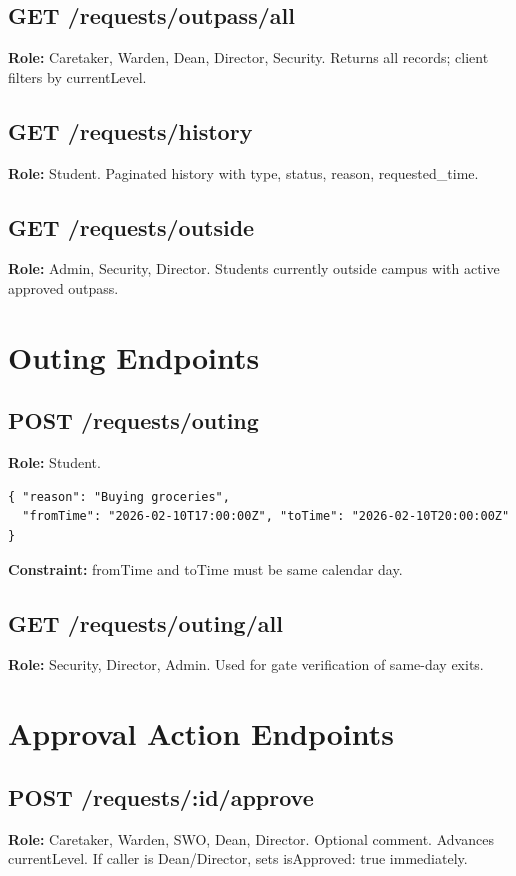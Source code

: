 \documentclass[12pt,a4paper]{report}
\begin{document}
\subsection{GET /requests/outpass/all}
\textbf{Role:} Caretaker, Warden, Dean, Director, Security. Returns all records; client filters by currentLevel.

\subsection{GET /requests/history} \textbf{Role:} Student. Paginated history with type, status, reason, requested\_time.

\subsection{GET /requests/outside} \textbf{Role:} Admin, Security, Director. Students currently outside campus with active approved outpass.

\section{Outing Endpoints}

\subsection{POST /requests/outing}
\textbf{Role:} Student.
\begin{lstlisting}[caption={Outing submission},label={lst:outingreq}]
{ "reason": "Buying groceries",
  "fromTime": "2026-02-10T17:00:00Z", "toTime": "2026-02-10T20:00:00Z" }
\end{lstlisting}
\textbf{Constraint:} fromTime and toTime must be same calendar day.

\subsection{GET /requests/outing/all} \textbf{Role:} Security, Director, Admin. Used for gate verification of same-day exits.

\section{Approval Action Endpoints}

\subsection{POST /requests/:id/approve}
\textbf{Role:} Caretaker, Warden, SWO, Dean, Director. Optional comment. Advances currentLevel. If caller is Dean/Director, sets isApproved: true immediately.
\end{document}
